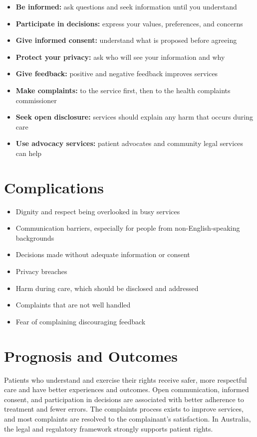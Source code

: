 \begin{itemize}
    \item \textbf{Be informed:} ask questions and seek information until you understand
    \item \textbf{Participate in decisions:} express your values, preferences, and concerns
    \item \textbf{Give informed consent:} understand what is proposed before agreeing
    \item \textbf{Protect your privacy:} ask who will see your information and why
    \item \textbf{Give feedback:} positive and negative feedback improves services
    \item \textbf{Make complaints:} to the service first, then to the health complaints commissioner
    \item \textbf{Seek open disclosure:} services should explain any harm that occurs during care
    \item \textbf{Use advocacy services:} patient advocates and community legal services can help
\end{itemize}

\section*{Complications}
\begin{itemize}
    \item Dignity and respect being overlooked in busy services
    \item Communication barriers, especially for people from non-English-speaking backgrounds
    \item Decisions made without adequate information or consent
    \item Privacy breaches
    \item Harm during care, which should be disclosed and addressed
    \item Complaints that are not well handled
    \item Fear of complaining discouraging feedback
\end{itemize}

\section*{Prognosis and Outcomes}
Patients who understand and exercise their rights receive safer, more respectful care and have better experiences and outcomes. Open communication, informed consent, and participation in decisions are associated with better adherence to treatment and fewer errors. The complaints process exists to improve services, and most complaints are resolved to the complainant's satisfaction. In Australia, the legal and regulatory framework strongly supports patient rights.

